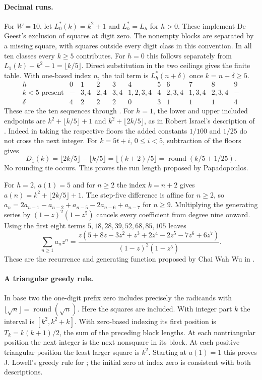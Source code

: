 \documentclass[11pt]{article}
\begin{document}
\paragraph{Decimal runs.} For $W=10$, let $L_0^*(k)=k^2+1$ and $L_h^*=L_h$ for $h>0$. These implement De Geest's exclusion of squares at digit zero. The nonempty blocks are separated by a missing square, with squares outside every digit class in this convention. In all ten classes every $k\ge5$ contributes. For $h=0$ this follows separately from $L_1(k)-k^2-1=\lfloor k/5\rfloor$. Direct substitution in the two ceilings gives the finite table. With one-based index $n$, the tail term is $L_h^*(n+\delta)$ once $k=n+\delta\ge5$.
\[
\begin{array}{c|cccccccccc}
h&0&1&2&3&4&5&6&7&8&9\\\hline
k<5\text{ present}& -&3,4&2,4&3,4&1,2,3,4&4&2,3,4&1,3,4&2,3,4&-\\
\delta&4&2&2&2&0&3&1&1&1&4
\end{array}
\]
These are the ten sequences  through . For $h=1$, the lower and upper included endpoints are $k^2+\lfloor k/5\rfloor+1$ and $k^2+\lfloor 2k/5\rfloor$, as in Robert Israel's description of . Indeed in taking the respective floors the added constants $1/100$ and $1/25$ do not cross the next integer. For $k=5t+i$, $0\le i<5$, subtraction of the floors gives
\[
 D_1(k)=\lfloor 2k/5\rfloor-\lfloor k/5\rfloor
 =\lfloor(k+2)/5\rfloor=\operatorname{round}(k/5+1/25).
\]
No rounding tie occurs. This proves the run length proposed by Papadopoulos.

For $h=2$, $a(1)=5$ and for $n\ge2$ the index $k=n+2$ gives
$a(n)=k^2+\lfloor2k/5\rfloor+1$. The step-five difference is affine for $n\ge2$, so $a_n=2a_{n-1}-a_{n-2}+a_{n-5}-2a_{n-6}+a_{n-7}$ for $n\ge9$. Multiplying the generating series by $(1-z)^2(1-z^5)$ cancels every coefficient from degree nine onward. Using the first eight terms $5,18,28,39,52,68,85,105$ leaves
\[
 \sum_{n\ge1}a_nz^n=\frac{z(5+8z-3z^2+z^3+2z^4-2z^5-7z^6+6z^7)}{(1-z)^2(1-z^5)}.
\]
These are the recurrence and generating function proposed by Chai Wah Wu in .

\paragraph{A triangular greedy rule.} In base two the one-digit prefix zero includes precisely the radicands with $\lfloor\sqrt n\rfloor=\operatorname{round}(\sqrt n)$. Here the squares are included. With integer part $k$ the interval is $[k^2,k^2+k]$. With zero-based indexing its first position is $T_k=k(k+1)/2$, the sum of the preceding block lengths. At each nontriangular position the next integer is the next nonsquare in its block. At each positive triangular position the least larger square is $k^2$. Starting at $a(1)=1$ this proves J. Lowell's greedy rule for ; the initial zero at index zero is consistent with both descriptions.
\end{document}
